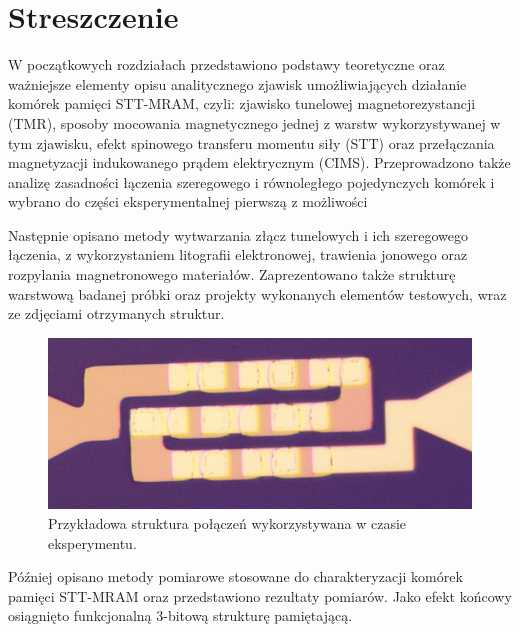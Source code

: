 \chapter{Streszczenie}
	W początkowych rozdziałach przedstawiono podstawy teoretyczne oraz ważniejsze elementy opisu analitycznego zjawisk umożliwiających działanie komórek pamięci STT-MRAM, czyli: zjawisko tunelowej magnetorezystancji (TMR), sposoby mocowania magnetycznego jednej z warstw wykorzystywanej w tym zjawisku, efekt spinowego transferu momentu siły (STT) oraz przełączania magnetyzacji indukowanego prądem elektrycznym (CIMS). Przeprowadzono także analizę zasadności łączenia szeregowego i równoległego pojedynczych komórek i wybrano do części eksperymentalnej pierwszą z możliwości
	
	Następnie opisano metody wytwarzania złącz tunelowych i ich szeregowego łączenia, z wykorzystaniem litografii elektronowej, trawienia jonowego oraz rozpylania magnetronowego materiałów. Zaprezentowano także strukturę warstwową badanej próbki oraz projekty wykonanych elementów testowych, wraz ze zdjęciami otrzymanych struktur.
	
	\begin{figure}[H]
        \centering
        \includegraphics[width=0.5\paperwidth]{img/04/fab_series_9_zoom.jpg}
        \caption{Przykładowa struktura połączeń wykorzystywana w czasie eksperymentu.}
        \label{FabricationSubstrate}
    \end{figure}
	
	Później opisano metody pomiarowe stosowane do charakteryzacji komórek pamięci STT-MRAM oraz przedstawiono rezultaty pomiarów. Jako efekt końcowy osiągnięto funkcjonalną 3-bitową strukturę pamiętającą.


